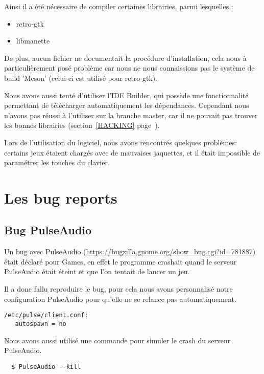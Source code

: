 \documentclass[12pt]{report}
\begin{document}
Ainsi il a été nécessaire de compiler certaines librairies, parmi
lesquelles :
\begin{itemize}
\item retro-gtk
\item libmanette\\
\end{itemize}

De plus, aucun fichier ne documentait la procédure d'installation,
cela nous à particulièrement posé problème car nous ne nous
connaissions pas le système de build 'Meson' (celui-ci est utilisé
pour retro-gtk).

Nous avons aussi tenté d'utiliser l'IDE Builder, qui possède une
fonctionnalité permettant de télécharger automatiquement les
dépendances. Cependant nous n'avons pas réussi à l'utiliser sur la branche master,
car il ne pouvait pas trouver les bonnes librairies (section~\ref{HACKING}
page~\pageref{HACKING}).

Lors de l'utilisation du logiciel, nous avons rencontrés quelques
problèmes: certains jeux étaient chargés avec de mauvaises jaquettes,
et il était impossible de paramétrer les touches du clavier.

\section{Les bug reports}
\subsection{Bug PulseAudio}
\label{PulseAudio}
Un bug avec PulseAudio (\url{https://bugzilla.gnome.org/show_bug.cgi?id=781887})
était déclaré pour Games, en effet le programme crashait quand le serveur
PulseAudio était éteint et que l'on tentait de lancer un jeu.

Il a donc fallu reproduire le bug, pour cela nous avons personnalisé notre
configuration PulseAudio pour qu'elle ne se relance pas automatiquement.
\begin{verbatim}
/etc/pulse/client.conf:
   autospawn = no
\end{verbatim}

Nous avons aussi utilisé une commande pour simuler le crash du serveur PulseAudio.
\begin{verbatim}
  $ PulseAudio --kill
\end{verbatim}
\end{document}
